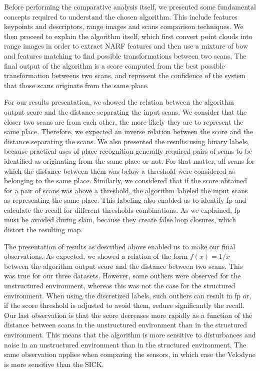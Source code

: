 Before performing the comparative analysis itself, we presented some fundamental concepts required to understand the chosen algorithm. This include features keypoints and descriptors, range images and scans comparison techniques. We then proceed to explain the algorithm itself, which first convert point clouds into range images in order to extract NARF features and then use a mixture of \gls*{bow} and features matching to find possible transformations between two scans. The final output of the algorithm is a score computed from the best possible transformation betweens two scans, and represent the confidence of the system that those scans originate from the same place. 

For our results presentation, we showed the relation between the algorithm output score and the distance separating the input scans. We consider that the closer two scans are from each other, the more likely they are to represent the same place. Therefore, we expected an inverse relation between the score and the distance separating the scans. We also presented the results using binary labels, because practical uses of place recognition generally required pairs of scans to be identified as originating from the same place or not. For that matter, all scans for which the distance between them was below a threshold were considered as belonging to the same place. Similarly, we considered that if the score obtained for a pair of scans was above a threshold, the algorithm labeled the input scans as representing the same place. This labeling also enabled us to identify \gls*{fp} and calculate the recall for different thresholds combinations. As we explained, \gls*{fp} must be avoided during \gls*{slam}, because they create false loop closures, which distort the resulting map. 

The presentation of results as described above enabled us to make our final observations. As expected, we showed a relation of the form $f(x)=1/x$ between the algorithm output score and the distance between two scans. This was true for our three datasets. However, some outliers were observed for the unstructured environment, whereas this was not the case for the structured environment. When using the discretized labels, such outliers can result in \gls*{fp} or, if the score threshold is adjusted to avoid them, reduce significantly the recall. Our last observation is that the score decreases more rapidly as a function of the distance between scans in the unstructured environment than in the structured environment. This means that the algorithm is more sensitive to disturbances and noise in an unstructured environment than in the structured environment. The same observation applies when comparing the sensors, in which case the Velodyne is more sensitive than the SICK.

